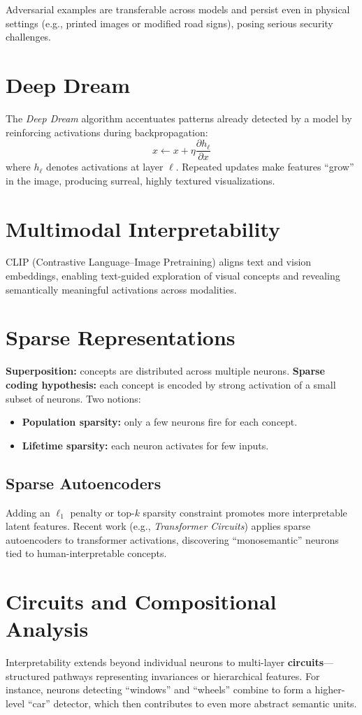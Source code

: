 \documentclass[12pt]{article}
\begin{document}
Adversarial examples are transferable across models and persist even in physical settings (e.g., printed images or modified road signs), posing serious security challenges.

\section{Deep Dream}
The \textit{Deep Dream} algorithm accentuates patterns already detected by a model by reinforcing activations during backpropagation:
\[
		x \leftarrow x + \eta \frac{\partial h_\ell}{\partial x}
\]
where $h_\ell$ denotes activations at layer $\ell$.
Repeated updates make features “grow” in the image, producing surreal, highly textured visualizations.

\section{Multimodal Interpretability}
CLIP (Contrastive Language–Image Pretraining) aligns text and vision embeddings, enabling text-guided exploration of visual concepts and revealing semantically meaningful activations across modalities.

\section{Sparse Representations}
\textbf{Superposition:} concepts are distributed across multiple neurons.
\textbf{Sparse coding hypothesis:} each concept is encoded by strong activation of a small subset of neurons. Two notions:
\begin{itemize}
		\item \textbf{Population sparsity:} only a few neurons fire for each concept.
		\item \textbf{Lifetime sparsity:} each neuron activates for few inputs.
\end{itemize}

\subsection{Sparse Autoencoders}
Adding an $\ell_1$ penalty or top-$k$ sparsity constraint promotes more interpretable latent features.
Recent work (e.g., \textit{Transformer Circuits}) applies sparse autoencoders to transformer activations, discovering “monosemantic” neurons tied to human-interpretable concepts.

\section{Circuits and Compositional Analysis}
Interpretability extends beyond individual neurons to multi-layer \textbf{circuits}—structured pathways representing invariances or hierarchical features.
For instance, neurons detecting “windows” and “wheels” combine to form a higher-level “car” detector, which then contributes to even more abstract semantic units.
\end{document}
